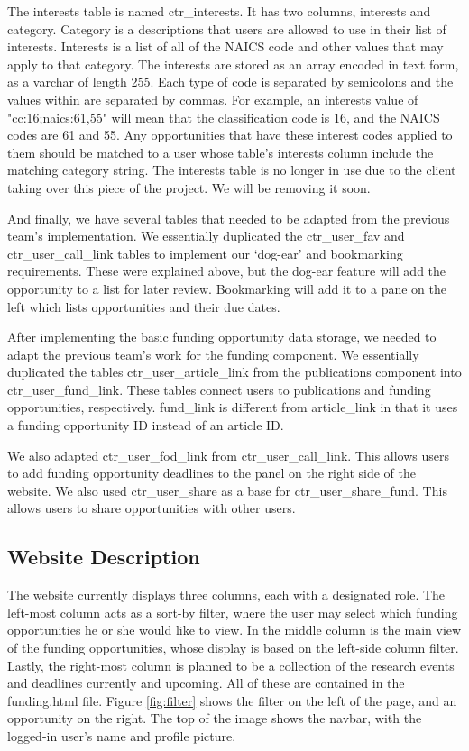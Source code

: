 \documentclass[onecolumn]{IEEEtran}
\begin{document}
The interests table is named ctr\_interests. It has two columns, interests and category. Category is a descriptions that users are allowed to use in their list of interests. Interests is a list of all of the NAICS code and other values that may apply to that category. The interests are stored as an array encoded in text form, as a varchar of length 255. Each type of code is separated by semicolons and the values within are separated by commas. For example, an interests value of "cc:16;naics:61,55" will mean that the classification code is 16, and the NAICS codes are 61 and 55. Any opportunities that have these interest codes applied to them should be matched to a user whose table's interests column include the matching category string. The interests table is no longer in use due to the client taking over this piece of the project. We will be removing it soon.

And finally, we have several tables that needed to be adapted from the previous team's implementation. We essentially duplicated the ctr\_user\_fav and ctr\_user\_call\_link tables to implement our `dog-ear' and bookmarking requirements. These were explained above, but the dog-ear feature will add the opportunity to a list for later review. Bookmarking will add it to a pane on the left which lists opportunities and their due dates. 

After implementing the basic funding opportunity data storage, we needed to adapt the previous team's work for the funding component. We essentially duplicated the tables ctr\_user\_article\_link from the publications component into ctr\_user\_fund\_link. These tables connect users to publications and funding opportunities, respectively. fund\_link is different from article\_link in that it uses a funding opportunity ID instead of an article ID.

We also adapted ctr\_user\_fod\_link from ctr\_user\_call\_link. This allows users to add funding opportunity deadlines to the panel on the right side of the website. We also used ctr\_user\_share as a base for ctr\_user\_share\_fund. This allows users to share opportunities with other users.

\subsection{Website Description}
The website currently displays three columns, each with a designated role. The left-most column acts as a sort-by filter, where the user may select which funding opportunities he or she would like to view. In the middle column is the main view of the funding opportunities, whose display is based on the left-side column filter. Lastly, the right-most column is planned to be a collection of the research events and deadlines currently and upcoming. All of these are contained in the funding.html file. Figure \ref{fig:filter} shows the filter on the left of the page, and an opportunity on the right. The top of the image shows the navbar, with the logged-in user's name and profile picture. 
\end{document}
